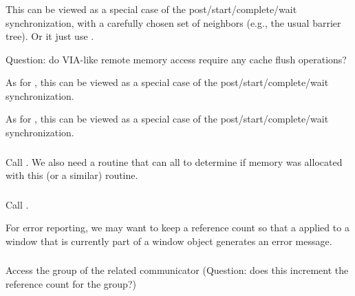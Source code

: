 \documentclass{article}
\begin{document}
\subsubsection{}
\begin{tcp}
This can be viewed as a special case of the post/start/complete/wait
synchronization, with a carefully chosen set of neighbors (e.g., the usual
barrier tree).  Or it just use .  

Question: do VIA-like remote memory access require any cache flush operations?
\end{tcp}

\begin{shmem}
As for \tcpname, this can be viewed as a special case of the
post/start/complete/wait synchronization. 
\end{shmem}

\begin{via}
As for \tcpname, this can be viewed as a special case of the
post/start/complete/wait synchronization. 
\end{via}

\subsubsection{}
Call .  We also need a routine that
 can all to determine if memory was allocated with
this (or a similar) routine.

\subsubsection{}
Call .

For error reporting, we may want to keep a reference count so that a
 applied to a window that is currently part of a window
object generates an error message.

\subsubsection{}

\subsubsection{}

\subsubsection{}
Access the group of the related communicator (Question: does this increment the
reference count for the group?)
\end{document}
